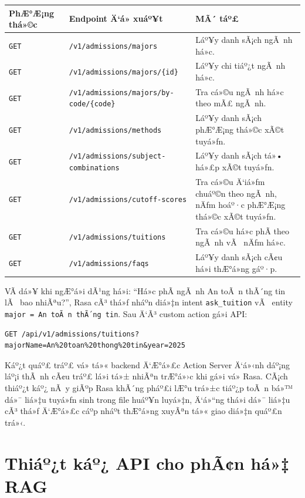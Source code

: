 ﻿\documentclass[12pt,a4paper]{report}
\begin{document}
\begin{longtable}{|p{3cm}|p{5cm}|p{7cm}|}
\hline
\textbf{PhÆ°Æ¡ng thá»©c} & \textbf{Endpoint Ä‘á» xuáº¥t} & \textbf{MÃ´ táº£} \\
\hline
\texttt{GET} & \texttt{/v1/admissions/majors} & Láº¥y danh sÃ¡ch ngÃ nh há»c. \\
\hline
\texttt{GET} & \texttt{/v1/admissions/majors/\{id\}} & Láº¥y chi tiáº¿t ngÃ nh há»c. \\
\hline
\texttt{GET} & \texttt{/v1/admissions/majors/by-code/\{code\}} & Tra cá»©u ngÃ nh há»c theo mÃ£ ngÃ nh. \\
\hline
\texttt{GET} & \texttt{/v1/admissions/methods} & Láº¥y danh sÃ¡ch phÆ°Æ¡ng thá»©c xÃ©t tuyá»ƒn. \\
\hline
\texttt{GET} & \texttt{/v1/admissions/subject-combinations} & Láº¥y danh sÃ¡ch tá»• há»£p xÃ©t tuyá»ƒn. \\
\hline
\texttt{GET} & \texttt{/v1/admissions/cutoff-scores} & Tra cá»©u Ä‘iá»ƒm chuáº©n theo ngÃ nh, nÄƒm hoáº·c phÆ°Æ¡ng thá»©c xÃ©t tuyá»ƒn. \\
\hline
\texttt{GET} & \texttt{/v1/admissions/tuitions} & Tra cá»©u há»c phÃ­ theo ngÃ nh vÃ  nÄƒm há»c. \\
\hline
\texttt{GET} & \texttt{/v1/admissions/faqs} & Láº¥y danh sÃ¡ch cÃ¢u há»i thÆ°á»ng gáº·p. \\
\hline
\end{longtable}

VÃ­ dá»¥ khi ngÆ°á»i dÃ¹ng há»i: ``Há»c phÃ­ ngÃ nh An toÃ n thÃ´ng tin lÃ  bao nhiÃªu?'', Rasa cÃ³ thá»ƒ nháº­n diá»‡n intent \texttt{ask\_tuition} vÃ  entity \texttt{major = An toÃ n thÃ´ng tin}. Sau Ä‘Ã³ custom action gá»i API:

\begin{verbatim}
GET /api/v1/admissions/tuitions?majorName=An%20toan%20thong%20tin&year=2025
\end{verbatim}

Káº¿t quáº£ tráº£ vá» tá»« backend Ä‘Æ°á»£c Action Server Ä‘á»‹nh dáº¡ng láº¡i thÃ nh cÃ¢u tráº£ lá»i tá»± nhiÃªn trÆ°á»›c khi gá»­i vá» Rasa. CÃ¡ch thiáº¿t káº¿ nÃ y giÃºp Rasa khÃ´ng pháº£i lÆ°u trá»±c tiáº¿p toÃ n bá»™ dá»¯ liá»‡u tuyá»ƒn sinh trong file huáº¥n luyá»‡n, Ä‘á»“ng thá»i dá»¯ liá»‡u cÃ³ thá»ƒ Ä‘Æ°á»£c cáº­p nháº­t thÆ°á»ng xuyÃªn tá»« giao diá»‡n quáº£n trá»‹.

\section{Thiáº¿t káº¿ API cho phÃ¢n há»‡ RAG}
\end{document}
